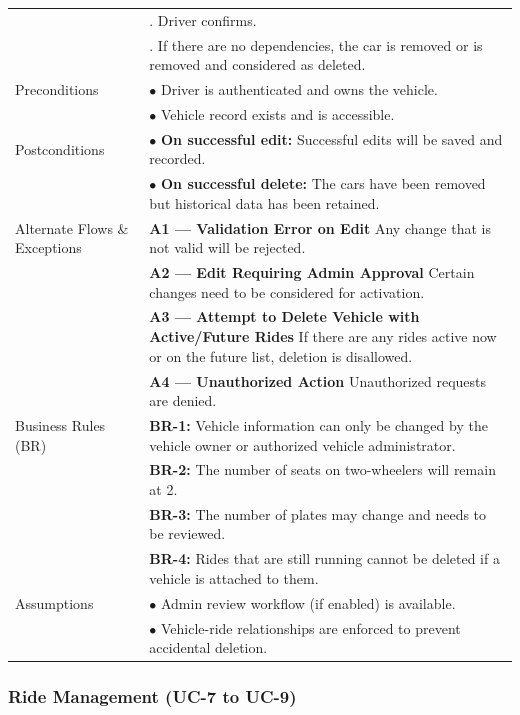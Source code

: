 \begin{longtable}{|>{\raggedright\arraybackslash}p{4cm}|>{\raggedright\arraybackslash}p{11cm}|}
& 2. Driver confirms. \\
& 3. If there are no dependencies, the car is removed or is removed and considered as deleted. \\
\hline
Preconditions & $\bullet$ Driver is authenticated and owns the vehicle. \\
& $\bullet$ Vehicle record exists and is accessible. \\
\hline
Postconditions & $\bullet$ \textbf{On successful edit:} Successful edits will be saved and recorded. \\
& $\bullet$ \textbf{On successful delete:} The cars have been removed but historical data has been retained. \\
\hline
Alternate Flows \& Exceptions & \textbf{A1 — Validation Error on Edit} \newline Any change that is not valid will be rejected. \\
& \textbf{A2 — Edit Requiring Admin Approval} \newline Certain changes need to be considered for activation. \\
& \textbf{A3 — Attempt to Delete Vehicle with Active/Future Rides} \newline If there are any rides active now or on the future list, deletion is disallowed. \\
& \textbf{A4 — Unauthorized Action} \newline Unauthorized requests are denied. \\
\hline
Business Rules (BR) & \textbf{BR-1:} Vehicle information can only be changed by the vehicle owner or authorized vehicle administrator. \\
& \textbf{BR-2:} The number of seats on two-wheelers will remain at 2. \\
& \textbf{BR-3:} The number of plates may change and needs to be reviewed. \\
& \textbf{BR-4:} Rides that are still running cannot be deleted if a vehicle is attached to them. \\
\hline
Assumptions & $\bullet$ Admin review workflow (if enabled) is available. \\
& $\bullet$ Vehicle-ride relationships are enforced to prevent accidental deletion. \\
\end{longtable}

\subsubsection{Ride Management (UC-7 to UC-9)}

